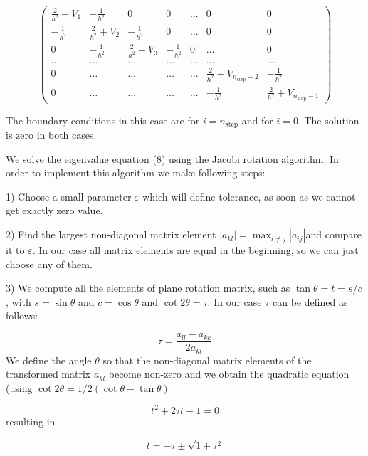 \documentclass[10pt]{article}
\begin{document}
\[
\left( 
\begin{array}{ccccccc}
\frac{2}{h^{2}}+V_{1} & -\frac{1}{h^{2}} & 0 & 0 & \dots  & 0 & 0 \\ 
-\frac{1}{h^{2}} & \frac{2}{h^{2}}+V_{2} & -\frac{1}{h^{2}} & 0 & \dots  & 0
& 0 \\ 
0 & -\frac{1}{h^{2}} & \frac{2}{h^{2}}+V_{3} & -\frac{1}{h^{2}} & 0 & \dots 
& 0 \\ 
\dots  & \dots  & \dots  & \dots  & \dots  & \dots  & \dots  \\ 
0 & \dots  & \dots  & \dots  & \dots  & \frac{2}{h^{2}}+V_{n_{\mathrm{step}%
	}-2} & -\frac{1}{h^{2}} \\ 
0 & \dots  & \dots  & \dots  & \dots  & -\frac{1}{h^{2}} & \frac{2}{h^{2}}%
+V_{n_{\mathrm{step}}-1}%
\end{array}%
\right) 
\]

The boundary conditions in this case are for $i=n_{\mathrm{step}}$ and for $%
i=0$. The solution is zero in both cases.

We solve the eigenvalue equation (8) using the Jacobi rotation
algorithm. In order to implement this algorithm we make following
steps:

1) Choose a small parameter $\varepsilon $ which will define tolerance, as
soon as we cannot get exactly zero value. 

2) Find the largest non-diagonal matrix element $\left\vert
a_{kl}\right\vert =\max\nolimits_{i\neq j}\left\vert a_{ij}\right\vert $and
compare it to $\varepsilon $.  In our case all matrix elements are equal in
the beginning, so we can just choose any of them.

3) We compute all the elements of plane rotation matrix, such as $%
\tan \theta =t=s/c$, with $s=\sin \theta $ and $c=\cos \theta $ and $\cot
2\theta =\tau $. In our case $\tau $ can be defined as follows:

\begin{equation}
\tau =\frac{a_{ll}-a_{kk}}{2a_{kl}}
\end{equation}%
We define the angle $\theta $ so that the non-diagonal matrix
elements of the transformed matrix $a_{kl}$ become non-zero and we obtain
the quadratic equation (using $\cot 2\theta =1/2(\cot \theta -\tan \theta )$

\begin{equation}
t^{2}+2\tau t-1=0
\end{equation}
resulting in

\begin{equation}
t=-\tau \pm \sqrt{1+\tau ^{2}}
\end{equation}
\end{document}
